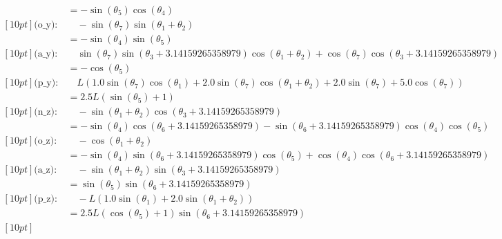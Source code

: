 \documentclass{article}
\begin{document}
\begin{align}
&= - \sin{\left(\theta_{5} \right)} \cos{\left(\theta_{4} \right)} \\ [10pt] 
\text{(o_{y})}: & \quad - \sin{\left(\theta_{7} \right)} \sin{\left(\theta_{1} + \theta_{2} \right)} \\ 
&= - \sin{\left(\theta_{4} \right)} \sin{\left(\theta_{5} \right)} \\ [10pt] 
\text{(a_{y})}: & \quad \sin{\left(\theta_{7} \right)} \sin{\left(\theta_{3} + 3.14159265358979 \right)} \cos{\left(\theta_{1} + \theta_{2} \right)} + \cos{\left(\theta_{7} \right)} \cos{\left(\theta_{3} + 3.14159265358979 \right)} \\ 
&= - \cos{\left(\theta_{5} \right)} \\ [10pt] 
\text{(p_{y})}: & \quad L \left(1.0 \sin{\left(\theta_{7} \right)} \cos{\left(\theta_{1} \right)} + 2.0 \sin{\left(\theta_{7} \right)} \cos{\left(\theta_{1} + \theta_{2} \right)} + 2.0 \sin{\left(\theta_{7} \right)} + 5.0 \cos{\left(\theta_{7} \right)}\right) \\ 
&= 2.5 L \left(\sin{\left(\theta_{5} \right)} + 1\right) \\ [10pt] 
\text{(n_{z})}: & \quad - \sin{\left(\theta_{1} + \theta_{2} \right)} \cos{\left(\theta_{3} + 3.14159265358979 \right)} \\ 
&= - \sin{\left(\theta_{4} \right)} \cos{\left(\theta_{6} + 3.14159265358979 \right)} - \sin{\left(\theta_{6} + 3.14159265358979 \right)} \cos{\left(\theta_{4} \right)} \cos{\left(\theta_{5} \right)} \\ [10pt] 
\text{(o_{z})}: & \quad - \cos{\left(\theta_{1} + \theta_{2} \right)} \\ 
&= - \sin{\left(\theta_{4} \right)} \sin{\left(\theta_{6} + 3.14159265358979 \right)} \cos{\left(\theta_{5} \right)} + \cos{\left(\theta_{4} \right)} \cos{\left(\theta_{6} + 3.14159265358979 \right)} \\ [10pt] 
\text{(a_{z})}: & \quad - \sin{\left(\theta_{1} + \theta_{2} \right)} \sin{\left(\theta_{3} + 3.14159265358979 \right)} \\ 
&= \sin{\left(\theta_{5} \right)} \sin{\left(\theta_{6} + 3.14159265358979 \right)} \\ [10pt] 
\text{(p_{z})}: & \quad - L \left(1.0 \sin{\left(\theta_{1} \right)} + 2.0 \sin{\left(\theta_{1} + \theta_{2} \right)}\right) \\ 
&= 2.5 L \left(\cos{\left(\theta_{5} \right)} + 1\right) \sin{\left(\theta_{6} + 3.14159265358979 \right)} \\ [10pt] 
\end{align}

\newpage
\end{document}
